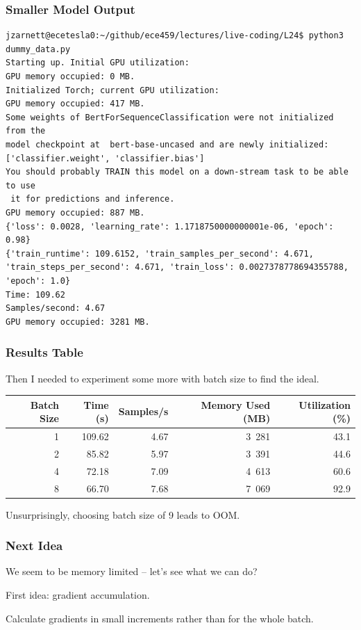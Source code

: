 \begin{frame}[fragile]
\frametitle{Smaller Model Output}

{\scriptsize
\begin{verbatim}
jzarnett@ecetesla0:~/github/ece459/lectures/live-coding/L24$ python3 dummy_data.py 
Starting up. Initial GPU utilization:
GPU memory occupied: 0 MB.
Initialized Torch; current GPU utilization:
GPU memory occupied: 417 MB.
Some weights of BertForSequenceClassification were not initialized from the 
model checkpoint at  bert-base-uncased and are newly initialized: 
['classifier.weight', 'classifier.bias']
You should probably TRAIN this model on a down-stream task to be able to use
 it for predictions and inference.
GPU memory occupied: 887 MB.
{'loss': 0.0028, 'learning_rate': 1.1718750000000001e-06, 'epoch': 0.98}
{'train_runtime': 109.6152, 'train_samples_per_second': 4.671, 
'train_steps_per_second': 4.671, 'train_loss': 0.0027378778694355788, 'epoch': 1.0}
Time: 109.62
Samples/second: 4.67
GPU memory occupied: 3281 MB.
\end{verbatim}
}

\end{frame}

\begin{frame}
\frametitle{Results Table}

Then I needed to experiment some more with batch size to find the ideal.

\begin{center}
\begin{tabular}{r|r|r|r|r}
\textbf{Batch Size} & \textbf{Time (s)} & \textbf{Samples/s} & \textbf{Memory Used (MB)} & \textbf{Utilization (\%)} \\ \hline
1 & 109.62 & 4.67 & 3~281 & 43.1 \\
2 & 85.82 & 5.97 & 3~391 & 44.6 \\
4 & 72.18 & 7.09 & 4~613 & 60.6 \\
8 & 66.70 & 7.68 & 7~069 & 92.9 \\
\end{tabular}
\end{center}

Unsurprisingly, choosing batch size of 9 leads to OOM.

\end{frame}

\begin{frame}
\frametitle{Next Idea}

We seem to be memory limited -- let's see what we can do?

First idea: \alert{gradient accumulation}. 

Calculate gradients in small increments rather than for the whole batch.

\end{frame}

